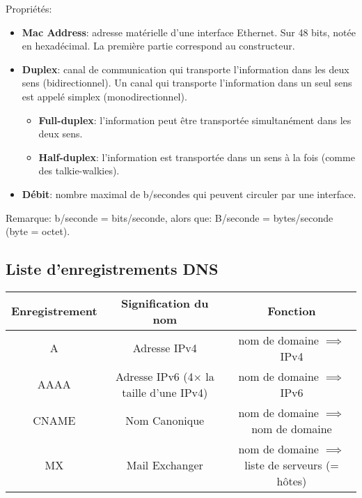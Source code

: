 \documentclass[class=article, crop=false]{standalone}
\begin{document}
\begin{itemize}
Propriétés:
\begin{itemize}
    \item \textbf{Mac Address}: adresse matérielle d'une interface Ethernet. Sur 48 bits, notée en hexadécimal. La première partie correspond au constructeur.
    \item \textbf{Duplex}: canal de communication qui transporte l'information dans les deux sens (bidirectionnel). Un canal qui transporte l'information dans un seul sens est appelé simplex (monodirectionnel).
    \begin{itemize}
        \item \textbf{Full-duplex}: l'information peut être transportée simultanément dans les deux sens.
        \item \textbf{Half-duplex}: l'information est transportée dans un sens à la fois (comme des talkie-walkies).
    \end{itemize}
    \item \textbf{Débit}: nombre maximal de b/secondes qui peuvent circuler par une interface.
\end{itemize}
Remarque: b/seconde = bits/seconde, alors que: B/seconde = bytes/seconde (byte = octet).
\end{itemize}










\subsection{Liste d'enregistrements DNS}

\begin{center}
\begin{tabular}{|c|c|c|} \hline
Enregistrement & Signification du nom & Fonction \\ \hline
A & Adresse IPv4 & nom de domaine $ \implies $ IPv4 \\
AAAA & Adresse IPv6 (4$\times$ la taille d'une IPv4) & nom de domaine $ \implies $ IPv6 \\
CNAME & Nom Canonique & nom de domaine $ \implies $ nom de domaine \\
MX & Mail Exchanger & nom de domaine $ \implies $ liste de serveurs (= hôtes) \\ \hline
\end{tabular}
\end{center}
\end{document}

